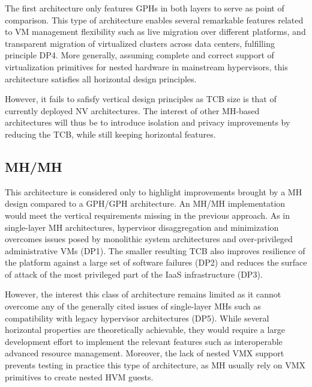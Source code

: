\documentclass{sig-alternate}
\begin{document}
\noindent The first architecture only features GPHs in both layers to serve as point of comparison. This type of architecture enables several remarkable features related to VM management flexibility such as live migration over different platforms, and transparent migration of virtualized clusters across data centers, fulfilling principle DP4. More generally, assuming complete and correct support of virtualization primitives for nested hardware in mainstream hypervisors, this architecture satisfies all horizontal design principles. 

However, it fails to safisfy vertical design principles as TCB size is that of currently deployed NV architectures. The interest of other MH-based architectures will thus be to introduce isolation and privacy improvements by reducing the TCB, while still keeping horizontal features.


\subsection{MH/MH}

\noindent This architecture is considered only to highlight improvements brought by a MH design compared to a GPH/GPH architecture. An MH/MH implementation would meet the vertical requirements missing in the previous approach. 
As in single-layer MH architectures, hypervisor disaggregation and minimization overcomes issues posed by monolithic system architectures and over-privileged administrative VMs (DP1). The smaller resulting TCB also improves resilience of the platform against a large set of software failures (DP2) and reduces the surface of attack of the most privileged part of the IaaS infrastructure (DP3). 

However, the interest this class of architecture remains limited as it cannot overcome any of the generally cited issues of single-layer MHs such as compatibility with legacy hypervisor architectures (DP5). While several horizontal properties are theoretically achievable, they would require a large development effort to implement the relevant features such as interoperable advanced resource management. Moreover, the lack of nested VMX support prevents testing in practice this type of architecture, as MH usually rely on VMX primitives to create nested HVM guests.
\end{document}
